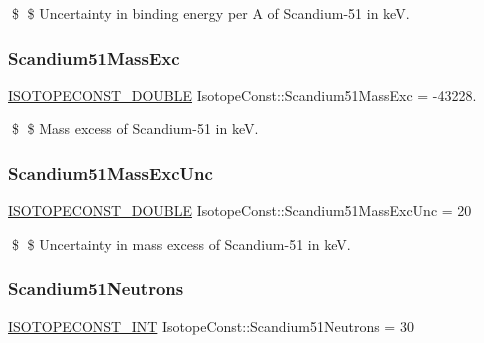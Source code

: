 \$ \$ Uncertainty in binding energy per A of Scandium-\/51 in keV. \mbox{\label{group___isotope_const-_scandium-_sc51_ga7c9cd7e4f77441bcc78f82f40eaf4060}} 
\subsubsection{\texorpdfstring{Scandium51\+Mass\+Exc}{Scandium51MassExc}}
{\footnotesize\ttfamily \mbox{\hyperlink{group___isotope_const-_macros_ga8f45a7272ce02c0b4c65c44636ed719a}{I\+S\+O\+T\+O\+P\+E\+C\+O\+N\+S\+T\+\_\+\+D\+O\+U\+B\+LE}} Isotope\+Const\+::\+Scandium51\+Mass\+Exc = -\/43228.}

\$ \$ Mass excess of Scandium-\/51 in keV. \mbox{\label{group___isotope_const-_scandium-_sc51_ga472100f32cae65cbac321110f3798acd}} 
\subsubsection{\texorpdfstring{Scandium51\+Mass\+Exc\+Unc}{Scandium51MassExcUnc}}
{\footnotesize\ttfamily \mbox{\hyperlink{group___isotope_const-_macros_ga8f45a7272ce02c0b4c65c44636ed719a}{I\+S\+O\+T\+O\+P\+E\+C\+O\+N\+S\+T\+\_\+\+D\+O\+U\+B\+LE}} Isotope\+Const\+::\+Scandium51\+Mass\+Exc\+Unc = 20}

\$ \$ Uncertainty in mass excess of Scandium-\/51 in keV. \mbox{\label{group___isotope_const-_scandium-_sc51_ga8da8f030adb489b59c5dcafed8beeabb}} 
\subsubsection{\texorpdfstring{Scandium51\+Neutrons}{Scandium51Neutrons}}
{\footnotesize\ttfamily \mbox{\hyperlink{group___isotope_const-_macros_ga5f18360b3e99483a35c32d789e62621c}{I\+S\+O\+T\+O\+P\+E\+C\+O\+N\+S\+T\+\_\+\+I\+NT}} Isotope\+Const\+::\+Scandium51\+Neutrons = 30}

